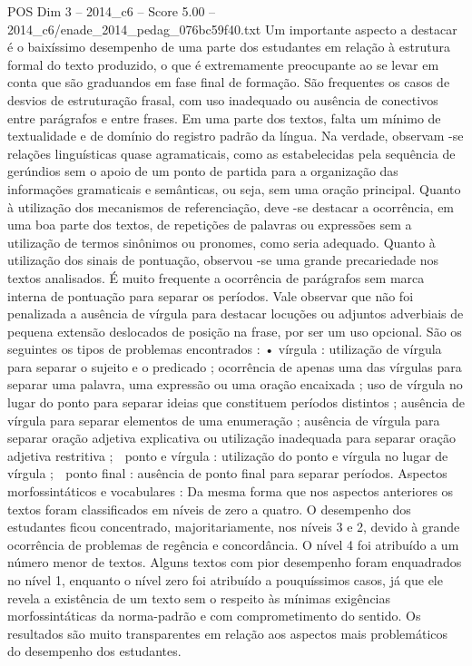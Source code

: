 \begin{textsample}{POS Dim 3 – 2014\_c6 – Score 5.00 – 2014\_c6/enade\_2014\_pedag\_076bc59f40.txt}
Um importante aspecto a destacar é o baixíssimo desempenho de uma parte dos estudantes em relação à estrutura formal do texto produzido, o que é extremamente preocupante ao se levar em conta que são graduandos em fase final de formação.
São frequentes os casos de desvios de estruturação frasal, com uso inadequado ou ausência de conectivos entre parágrafos e entre frases.
Em uma parte dos textos, falta um mínimo de textualidade e de domínio do registro padrão da língua.
Na verdade, observam -se relações linguísticas quase agramaticais, como as estabelecidas pela sequência de gerúndios sem o apoio de um ponto de partida para a organização das informações gramaticais e semânticas, ou seja, sem uma oração principal.
Quanto à utilização dos mecanismos de referenciação, deve -se destacar a ocorrência, em uma boa parte dos textos, de repetições de palavras ou expressões sem a utilização de termos sinônimos ou pronomes, como seria adequado.
Quanto à utilização dos sinais de pontuação, observou -se uma grande precariedade nos textos analisados.
É muito frequente a ocorrência de parágrafos sem marca interna de pontuação para separar os períodos.
Vale observar que não foi penalizada a ausência de vírgula para destacar locuções ou adjuntos adverbiais de pequena extensão deslocados de posição na frase, por ser um uso opcional.
São os seguintes os tipos de problemas encontrados : • vírgula : utilização de vírgula para separar o sujeito e o predicado ; ocorrência de apenas uma das vírgulas para separar uma palavra, uma expressão ou uma oração encaixada ; uso de vírgula no lugar do ponto para separar ideias que constituem períodos distintos ; ausência de vírgula para separar elementos de uma enumeração ; ausência de vírgula para separar oração adjetiva explicativa ou utilização inadequada para separar oração adjetiva restritiva ;  ponto e vírgula : utilização do ponto e vírgula no lugar de vírgula ;  ponto final : ausência de ponto final para separar períodos.
Aspectos morfossintáticos e vocabulares : Da mesma forma que nos aspectos anteriores os textos foram classificados em níveis de zero a quatro.
O desempenho dos estudantes ficou concentrado, majoritariamente, nos níveis 3 e 2, devido à grande ocorrência de problemas de regência e concordância.
O nível 4 foi atribuído a um número menor de textos.
Alguns textos com pior desempenho foram enquadrados no nível 1, enquanto o nível zero foi atribuído a pouquíssimos casos, já que ele revela a existência de um texto sem o respeito às mínimas exigências morfossintáticas da norma-padrão e com comprometimento do sentido.
Os resultados são muito transparentes em relação aos aspectos mais problemáticos do desempenho dos estudantes.

\end{textsample}
